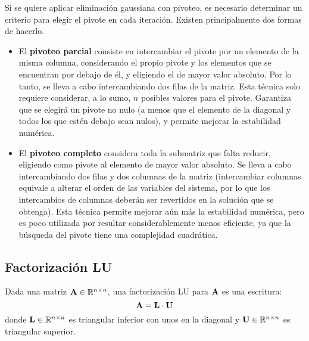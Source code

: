 Si se quiere aplicar eliminación gaussiana con pivoteo, es necesario
determinar un criterio para elegir el pivote en cada iteración. Existen
principalmente dos formas de hacerlo.
\begin{itemize}
\item El \textbf{pivoteo parcial} consiste en intercambiar el pivote por un
    elemento de la misma columna, considerando el propio pivote y los
    elementos que se encuentran por debajo de él, y eligiendo el de mayor
    valor absoluto. Por lo tanto, se lleva a cabo intercambiando dos filas de
    la matriz. Esta técnica solo requiere considerar, a lo sumo, $n$
    posibles valores para el pivote. Garantiza que se elegirá un pivote no
    nulo (a menos que el elemento de la diagonal y todos los que estén debajo
    sean nulos), y permite mejorar la estabilidad numérica.
\item El \textbf{pivoteo completo} considera toda la submatriz que falta
    reducir, eligiendo como pivote al elemento de mayor valor absoluto. Se
    lleva a cabo intercambiando dos filas y dos columnas de la matriz
    (intercambiar columnas equivale a alterar el orden de las variables del
    sistema, por lo que los intercambios de columnas deberán ser revertidos
    en la solución que se obtenga).
    Esta técnica permite mejorar aún más la estabilidad numérica, pero
    es poco utilizada por resultar considerablemente menos eficiente, ya que
    la búsqueda del pivote tiene una complejidad cuadrática.
\end{itemize}

\subsection{Factorización LU}

Dada una matriz $\mathbf{A} \in \mathbb{R}^{n \times n}$, una factorización LU para
$\mathbf{A}$ es una escritura:
\[ \mathbf{A} = \mathbf{L} \cdot \mathbf{U} \]
donde $\mathbf{L} \in \mathbb{R}^{n \times n}$ es triangular inferior con unos en
la diagonal y $\mathbf{U} \in \mathbb{R}^{n \times n}$ es triangular superior.

